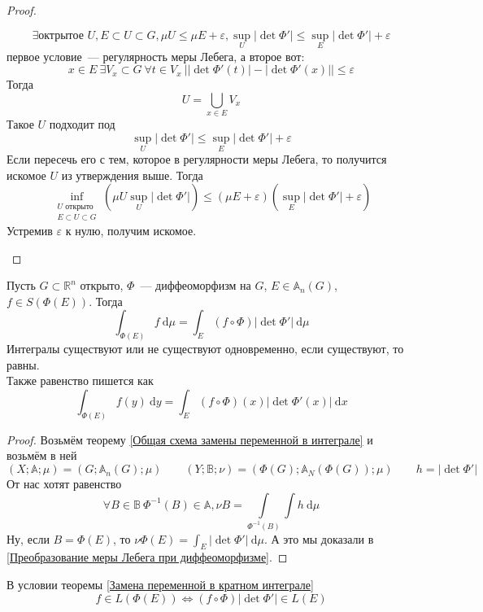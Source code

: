 \documentclass{article}
\let\eps\varepsilon
\begin{document}
\begin{proof}
\begin{enumerate}
            $$
            \exists\text{октрытое }U,E\subset U\subset G,\mu U\leqslant\mu E+\eps,\sup\limits_U|\det\Phi'|\leqslant\sup\limits_E|\det\Phi'|+\eps
            $$
            первое условие~--- регулярность меры Лебега, а второе вот:
            $$
            x\in E~\exists V_x\subset G~\forall t\in V_x~\left||\det\Phi'(t)|-|\det\Phi'(x)|\right|\leqslant\eps
            $$
            Тогда
            $$
            U=\bigcup\limits_{x\in E}V_x
            $$
            Такое $U$ подходит под
            $$
            \sup\limits_U|\det\Phi'|\leqslant\sup\limits_E|\det\Phi'|+\eps
            $$
            Если пересечь его с тем, которое в регулярности меры Лебега, то получится искомое $U$ из утверждения выше. Тогда
            $$
            \inf\limits_{\substack{U\text{ открыто}\\E\subset U\subset G}}\left(\mu U\sup\limits_U|\det\Phi'|\right)\leqslant (\mu E+\eps)\left(\sup\limits_E|\det\Phi'|+\eps\right)
            $$
            Устремив $\eps$ к нулю, получим искомое.
        \end{enumerate}
    \end{proof}
    \begin{theorem}
        \label{Замена переменной в кратном интеграле}
        Пусть $G\subset\mathbb R^n$ открыто, $\Phi$~--- диффеоморфизм на $G$, $E\in\mathbb A_n(G)$, $f\in S(\Phi(E))$. Тогда
        $$
        \int_{\Phi(E)}f~\mathrm d\mu=\int_E(f\circ\Phi)|\det\Phi'|~\mathrm d\mu
        $$
        Интегралы существуют или не существуют одновременно, если существуют, то равны.\\
        Также равенство пишется как
        $$
        \int_{\Phi(E)}f(y)~\mathrm dy=\int_E(f\circ\Phi)(x)|\det\Phi'(x)|~\mathrm dx
        $$
    \end{theorem}
    \begin{proof}
        Возьмём теорему \ref{Общая схема замены переменной в интеграле} и возьмём в ней
        $$
        (X;\mathbb A;\mu)=(G;\mathbb A_n(G);\mu)\qquad (Y;\mathbb B;\nu)=(\Phi(G);\mathbb A_N(\Phi(G));\mu)\qquad h=|\det\Phi'|
        $$
        От нас хотят равенство
        $$
        \forall B\in\mathbb B~\Phi^{-1}(B)\in\mathbb A,\nu B=\int\limits_{\Phi^{-1}(B)}\int h~\mathrm d\mu
        $$
        Ну, если $B=\Phi(E)$, то $\nu\Phi(E)=\int_E|\det\Phi'|~\mathrm d\mu$. А это мы доказали в \ref{Преобразование меры Лебега при диффеоморфизме}.
    \end{proof}
    \begin{corollary}
        В условии теоремы \ref{Замена переменной в кратном интеграле}
        $$
        f\in L(\Phi(E))\Leftrightarrow(f\circ\Phi)|\det\Phi'|\in L(E)
        $$
    \end{corollary}
\end{document}
